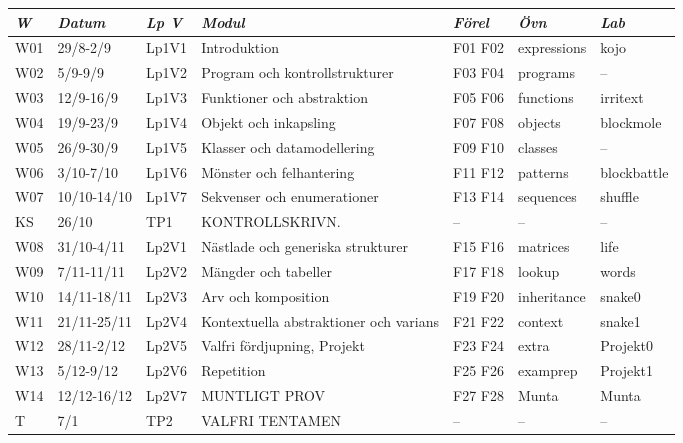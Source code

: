 \begin{tabular}{l|l|l|l|l|l|l}
\textit{W} & \textit{Datum} & \textit{Lp V} & \textit{Modul} & \textit{Förel} & \textit{Övn} & \textit{Lab} \\ \hline \hline
W01 & 29/8-2/9 & Lp1V1 & Introduktion & F01 F02 & expressions & kojo \\
W02 & 5/9-9/9 & Lp1V2 & Program och kontrollstrukturer & F03 F04 & programs & -- \\
W03 & 12/9-16/9 & Lp1V3 & Funktioner och abstraktion & F05 F06 & functions & irritext \\
W04 & 19/9-23/9 & Lp1V4 & Objekt och inkapsling & F07 F08 & objects & blockmole \\
W05 & 26/9-30/9 & Lp1V5 & Klasser och datamodellering & F09 F10 & classes & -- \\
W06 & 3/10-7/10 & Lp1V6 & Mönster och felhantering & F11 F12 & patterns & blockbattle \\
W07 & 10/10-14/10 & Lp1V7 & Sekvenser och enumerationer & F13 F14 & sequences & shuffle \\
KS & 26/10 & TP1 & KONTROLLSKRIVN. & -- & -- & -- \\
W08 & 31/10-4/11 & Lp2V1 & Nästlade och generiska strukturer & F15 F16 & matrices & life \\
W09 & 7/11-11/11 & Lp2V2 & Mängder och tabeller & F17 F18 & lookup & words \\
W10 & 14/11-18/11 & Lp2V3 & Arv och komposition & F19 F20 & inheritance & snake0 \\
W11 & 21/11-25/11 & Lp2V4 & Kontextuella abstraktioner och varians & F21 F22 & context & snake1 \\
W12 & 28/11-2/12 & Lp2V5 & Valfri fördjupning, Projekt & F23 F24 & extra & Projekt0 \\
W13 & 5/12-9/12 & Lp2V6 & Repetition & F25 F26 & examprep & Projekt1 \\
W14 & 12/12-16/12 & Lp2V7 & MUNTLIGT PROV & F27 F28 & Munta & Munta \\
T & 7/1 & TP2 & VALFRI TENTAMEN & -- & -- & -- \\
\end{tabular}
